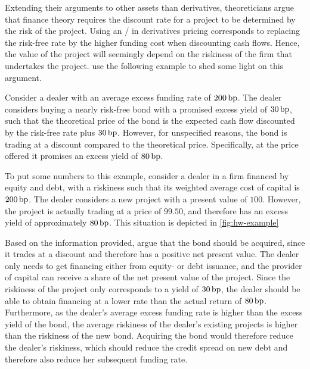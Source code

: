 \documentclass[main.tex]{subfiles}
\begin{document}
            Extending their arguments to other assets than derivatives, 
            theoreticians argue that finance theory requires the discount rate for a project 
            to be determined by the risk of the project.
            Using an \FVA/ in derivatives pricing corresponds to replacing the risk-free rate by the higher funding cost
            when discounting cash flows.
            Hence, the value of the project will seemingly depend on the riskiness of the firm that undertakes the project.
            \textcite{HullWhite2012FVA} use the following example to shed some light on this argument.

            \begin{example}
            Consider a dealer with an average excess funding rate of $200\,\text{bp}$. 
            The dealer considers buying a nearly risk-free bond with a promised excess yield of $30\,\text{bp}$,
            such that the theoretical price of the bond is the expected cash flow 
            discounted by the risk-free rate plus $30\,\text{bp}$.
            However, for unspecified reasons, the bond is trading at a discount compared to the theoretical price.
            Specifically, at the price offered it promises an excess yield of $80\,\text{bp}$.
            
            To put some numbers to this example,
            consider a dealer in a firm financed by equity and debt, 
            with a riskiness such that its weighted average cost of capital is $200\,\text{bp}$.
            The dealer considers a new project with a present value of $100$.
            However, the project is actually trading at a price of $99.50$,
            and therefore has an excess yield of approximately $80\,\text{bp}$.
            This situation is depicted in \cref{fig:hw-example}

            Based on the information provided, \textcite{HullWhite2012FVA} argue that the bond should be acquired,
            since it trades at a discount and therefore has a positive net present value.
            The dealer only needs to get financing either from equity- or debt issuance,
            and the provider of capital can receive a share of the net present value of the project.
            Since the riskiness of the project only corresponds to a yield of $30\,\text{bp}$,
            the dealer should be able to obtain financing at a lower rate 
            than the actual return of $80\,\text{bp}$.
            Furthermore, as the dealer's average excess funding rate is higher than the excess yield of the bond, 
            the average riskiness of the dealer's existing projects is higher than the riskiness of the new bond.
            Acquiring the bond would therefore reduce the dealer's riskiness,
            which should reduce the credit spread on new debt and therefore also reduce her subsequent funding rate.
            \end{example}
\end{document}
